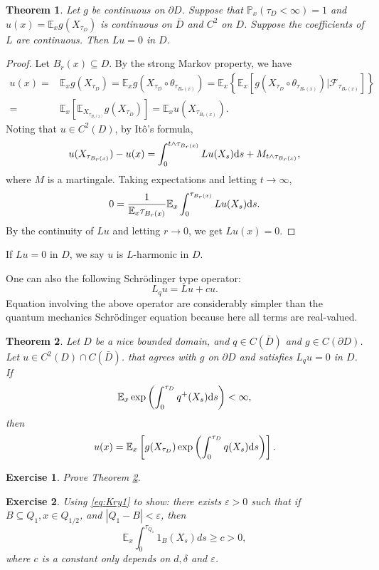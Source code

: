 \documentclass[twoside, 12pt]{book}
\numberwithin{equation}{chapter}
\newtheorem{theorem}{Theorem}[section]
\newtheorem{exercise}{Exercise}[section]
\def\cF{{\mathcal F}}
\def\mE{{\mathbb E}}
\def\mP{{\mathbb P}}
\def\l{\left}
\def\r{\right}
\def\geq{\geqslant}
\def\p{\partial}
\def\d{\text{\rm{d}}}
\begin{document}
	\begin{theorem}
		Let $g$ be continuous on $\p D$. Suppose that $\mP_x\l( \tau_D<\infty\r)=1$ and $u(x)=\mE_x g(X_{\tau_D})$ is continuous on $\bar D$ and $C^2$ on $D$. Suppose the coefficients of $L$ are continuous. Then $L u=0$ in $D$.
	\end{theorem}
    \begin{proof}
    Let $B_r(x)\subseteq D$. By the strong Markov property, we have 
        \begin{align*}
          u(x)=&\mE_x g(X_{\tau_D})= \mE_x g(X_{\tau_{D}}\circ \theta_{\tau_{B_r(x)}})=\mE_x \l\{ \mE_x \l[ g(X_{\tau_{D}}\circ \theta_{\tau_{B_r(x)}})\Big|\cF_{\tau_{B_r(x)}}\r] \r\}\\
          =&\mE_x \l[ \mE_{X_{\tau_{B_r(x)}}} g(X_{\tau_D})\r]= \mE_x u(X_{\tau_{B_r(x)}}). 
        \end{align*}
     Noting that $u\in C^2(D)$, by It\^o's formula, 
     \[
         u(X_{\tau_{B_r(x)}})-u(x) = \int_0^{t\wedge \tau_{B_r(x)}} L u (X_s) \d s+ M_{t\wedge \tau_{B_r(x)}}, 
     \]
     where $M$ is a martingale. Taking expectations and letting $t\to\infty$, 
     \[
        0= \frac{1}{\mE_x\tau_{B_r(x)}}\mE_x \int_0^{\tau_{B_r(x)}} L u(X_s) \d s.  
     \]
     By the continuity of $Lu$ and letting $r\to0$, we get $Lu(x)=0$. 
     \end{proof}
		
	If $Lu=0$ in $D$, we say $u$ is $L$-harmonic in $D$.

    One can also the following Schrödinger type operator: 
    \[
      L_q u= Lu+cu. 
    \]
   Equation involving the above operator are considerably simpler than the quantum mechanics Schrödinger equation because here all terms are real-valued. 

   \begin{theorem}\label{thm:FK2}
       Let $D$ be a nice bounded domain, and $q\in C(\bar D)$ and $g\in C(\p D)$. Let $u\in C^2(D)\cap C(\bar D)$. that agrees with $g$  on $\p D$ and satisfies $L_q u=0$ in $D$. If 
       \[
          \mE_x \exp\l(\int_0^{\tau_D}q^+(X_s) \d s\r)<\infty, 
       \]
       then 
       \[
         u(x)=\mE_x \l[ g(X_{\tau_D})\exp\l(\int_0^{\tau_D}q(X_s) \d s\r)\r].
       \]
   \end{theorem}
   
	\begin{exercise}
	    Prove Theorem \ref{thm:FK2}. 
	\end{exercise}
	\begin{exercise}
	   Using \eqref{eq:Kry1} to show: there exists $\varepsilon>0$ such that if $B \subseteq Q_1, x \in Q_{1/2}$, and $|Q_1-B|<\varepsilon$, then
$$
\mathbb{E}_x \int_0^{\tau_{Q_1}} 1_B\left(X_s\right) d s \geq c>0, 
$$
where $c$ is a constant only depends on $d,\delta$ and $\varepsilon$. 
	\end{exercise}
	
\end{document}
